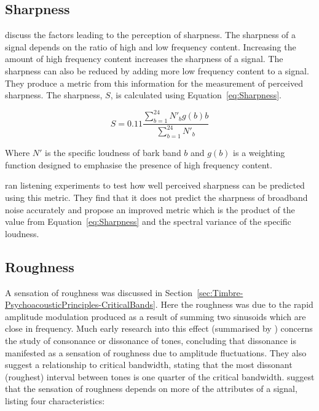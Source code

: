 	\subsection{Sharpness}
	\label{sec:Timbre-TimbralFeatures-Sharpness}
		\citet{fastl2007psychoacoustics} discuss the factors leading to the perception of sharpness. The sharpness
		of a signal depends on the ratio of high and low frequency content. Increasing the amount of high frequency
		content increases the sharpness of a signal. The sharpness can also be reduced by adding more low frequency
		content to a signal. They produce a metric from this information for the measurement of perceived
		sharpness. The sharpness, $S$, is calculated using Equation~\ref{eq:Sharpness}.

		\begin{equation}
			S = 0.11\frac{\sum_{b = 1}^{24} N'_{b}g(b)b}{\sum_{b = 1}^{24}N'_{b}}
			\label{eq:Sharpness}
		\end{equation}

		Where $N'$ is the specific loudness of bark band $b$ and $g(b)$ is a weighting function designed to
		emphasise the presence of high frequency content.

		\citet{marui2006predicting} ran listening experiments to test how well perceived sharpness can be predicted
		using this metric. They find that it does not predict the sharpness of broadband noise accurately and
		propose an improved metric which is the product of the value from Equation~\ref{eq:Sharpness} and the
		spectral variance of the specific loudness.

	\subsection{Roughness}
	\label{sec:Timbre-TimbralFeatures-Roughness}
		A sensation of roughness was discussed in Section~\ref{sec:Timbre-PsychoacousticPrinciples-CriticalBands}.
		Here the roughness was due to the rapid amplitude modulation produced as a result of summing two sinusoids
		which are close in frequency. Much early research into this effect (summarised by \citet{plomp1965tonal})
		concerns the study of consonance or dissonance of tones, concluding that dissonance is manifested as a
		sensation of roughness due to amplitude fluctuations. They also suggest a relationship to critical
		bandwidth, stating that the most dissonant (roughest) interval between tones is one quarter of the critical
		bandwidth. \citet{vassilakis2010psychoacoustic} suggest that the sensation of roughness depends on more of
		the attributes of a signal, listing four characteristics:

